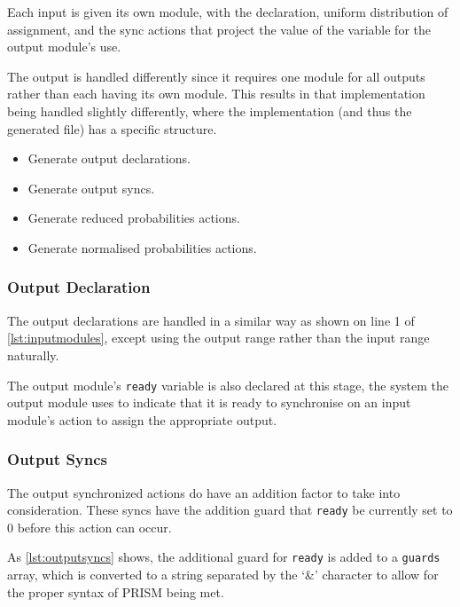 \documentclass[report.tex]{subfiles}
\begin{document}
Each input is given its own module, with the declaration, uniform distribution
of assignment, and the sync actions that project the value of the variable for
the output module's use.

The output is handled differently since it requires one module for all outputs
rather than each having its own module. This results in that implementation
being handled slightly differently, where the implementation (and thus the
generated file) has a specific structure.
\begin{itemize}
    \item Generate output declarations.
    \item Generate output syncs.
    \item Generate reduced probabilities actions.
    \item Generate normalised probabilities actions.
\end{itemize}

\subsubsection{Output Declaration} %
\label{ssub:output_dec_impl}
The output declarations are handled in a similar way as shown on line  1 of
\ref{lst:inputmodules}, except using the output range rather than the input
range naturally.

The output module's \texttt{ready} variable is also declared at this stage,
the system the output module uses to indicate that it is ready to synchronise
on an input module's action to assign the appropriate output.

\subsubsection{Output Syncs} %
\label{ssub:output_syncs}
The output synchronized actions do have an addition factor to take into
consideration. These syncs have the addition guard that \texttt{ready} be
currently set to 0 before this action can occur.



As \ref{lst:outputsyncs} shows, the additional guard for \texttt{ready} is
added to a \texttt{guards} array, which is converted to a string separated by
the `\&' character to allow for the proper syntax of PRISM being met.
\end{document}
